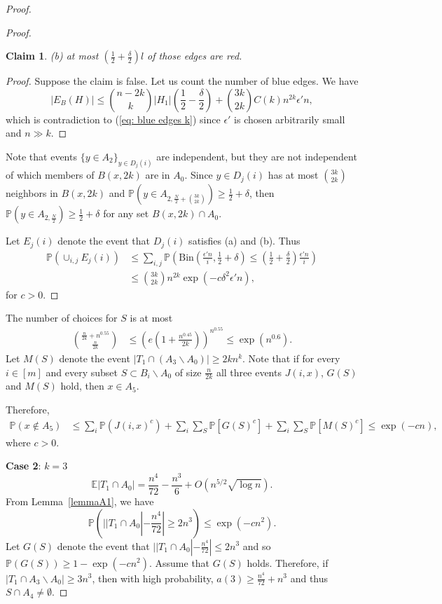 \documentclass[reqno,11pt]{amsart}
\newtheorem{claim}[theorem]{Claim}
\renewcommand{\leq}{\leqslant}
\renewcommand{\geq}{\geqslant}
\begin{document}
\begin{proof}
\begin{proof}
\begin{claim}
(b) at most $(\frac{1}{2}+\frac{\delta}{2})l$ of those edges are red.
\end{claim}
\begin{proof} Suppose the claim is false. Let us count the number of blue edges. We have 
$$|E_B(H)| \leq \binom{n-2k}{k}|H_1|(\frac{1}{2}-\frac{\delta}{2})+\binom{3k}{2k}C(k)n^{2k} \epsilon' n,$$
which is contradiction to (\ref{eq: blue edges k}) since $\epsilon'$ is chosen arbitrarily small and $n \gg k$. 
\end{proof}
Note that events $\{ y \in A_2\}_{y \in D_j(i)}$ are independent, but they are not independent of which members of $B(x,2k)$ are in $A_0$. Since $y \in D_j(i)$ has at most $\binom{3k}{2k}$ neighbors in $B(x,2k)$ and $\mathbb{P}(y \in A_{2,\frac{N}{2}+\binom{3k}{2k}}) \geq \frac{1}{2}+\delta $, then $\mathbb{P}(y \in A_{2,\frac{N}{2}}) \geq \frac{1}{2}+\delta$ for any set $B(x,2k) \cap A_0$.

Let $E_j(i)$ denote the event that $D_j(i)$ satisfies (a) and (b). Thus 
\begin{align*}
   \mathbb{P}(\cup_{i,j}E_j(i)) & \leq \sum_{i,j}\mathbb{P}\left(\text{Bin}\left(\frac{\epsilon' n}{i},\frac{1}{2}+\delta \right) \leq \left(\frac{1}{2}+\frac{\delta}{2} \right) \frac{\epsilon' n}{i} \right) \\
   & \leq \binom{3k}{2k}n^{2k} \exp(-c\delta^2 \epsilon' n),
\end{align*}
for $c >0$.
\end{proof}


The number of choices for $S$ is at most
\begin{align*}
    \binom{\frac{n}{2k}+n^{0.55}}{\frac{n}{2k}} &\leq \left(e \left(1+\frac{n^{0.45}}{2k} \right) \right)^{n^{0.55}} \leq \exp(n^{0.6}).
\end{align*}
Let $M(S)$ denote the event $|T_1\cap (A_3 \backslash A_0)| \geq 2kn^k$. Note that if for every $i \in [m]$ and every subset $S \subset B_i \backslash A_0$ of size $\frac{n}{2k}$ all three events $J(i,x)$, $G(S)$ and $M(S)$ hold, then $x \in A_5$. 

Therefore,
\begin{align*}
   \mathbb{P}(x \notin A_5) &\leq \sum_{i}\mathbb{P}(J(i,x)^c)+\sum_{i}\sum_{S}\mathbb{P}[G(S)^c]+\sum_{i}\sum_{S}\mathbb{P}[M(S)^c] \leq \exp(-cn),
\end{align*}
where $c>0$. 

\textbf{Case 2}: $k=3$
$$\mathbb{E}|T_1 \cap A_0|=\frac{n^4}{72}-\frac{n^3}{6}+ O(n^{5/2} \sqrt{\log n}). $$
From Lemma~\ref{lemmaA1}, we have 
$$\mathbb{P}(||T_1 \cap A_0|-\frac{n^4}{72}| \geq 2n^3 ) \leq \exp(-cn^2).$$
Let $G(S)$ denote the event that $||T_1 \cap A_0|-\frac{n^4}{72}| \leq 2n^3$ and so $\mathbb{P}(G(S)) \geq 1-\exp(-cn^2)$. Assume that $G(S)$ holds. Therefore, if $|T_1 \cap A_3 \backslash A_0| \geq 3n^3$, then with high probability, $a(3) \geq \frac{n^4}{72}+n^3$ and thus $S\cap A_4 \neq \emptyset.$


\end{proof}
\end{document}
